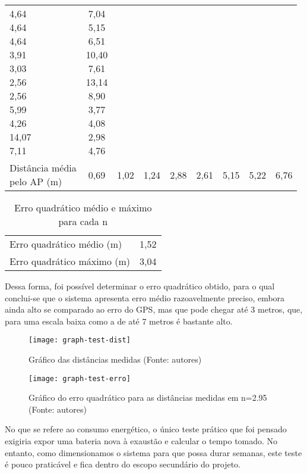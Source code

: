 \begin{table}[ht]
\begin{tabular}{l|cccccccc}
\makecell{4,64 \\ 4,64 \\ 4,64 \\ 3,91 \\ 3,03 \\ 2,56 \\ 2,56 \\ 5,99 \\ 4,26 \\ 14,07 \\ 7,11} &
\makecell{7,04 \\ 5,15 \\ 6,51 \\ 10,40 \\ 7,61 \\ 13,14 \\ 8,90 \\ 3,77 \\ 4,08 \\ 2,98 \\ 4,76}
\vspace{0.4cm}\\

\makecell{Distância média \\ pelo AP (m)} & 0,69 & 1,02 & 1,24 & 2,88 & 2,61 & 5,15 & 5,22 & 6,76
\end{tabular}
\end{table}

\begin{table}[ht]
\centering
\caption{Erro quadrático médio e máximo para cada n}
\vspace{0.5cm}
\begin{tabular}{l|c}
\hline
Erro quadrático médio (m) & 1,52 \vspace{0.4cm}\\
Erro quadrático máximo (m) & 3,04
\end{tabular}
\end{table}

Dessa forma, foi possível determinar o erro quadrático obtido, para o qual conclui-se que o sistema apresenta erro médio razoavelmente preciso, embora ainda alto se comparado ao erro do GPS, mas que pode chegar até 3 metros, que, para uma escala baixa como a de até 7 metros é bastante alto.

\begin{figure}[ht]
  \centering
    \texttt{[image: graph-test-dist]}
  \caption{Gráfico das distâncias medidas (Fonte: autores)}
\end{figure}

\begin{figure}[ht]
  \centering
    \texttt{[image: graph-test-erro]}
  \caption{Gráfico do erro quadrático para as distâncias medidas em n=2.95 (Fonte: autores)}
\end{figure}

No que se refere ao consumo energético, o único teste prático que foi pensado exigiria expor uma bateria nova à exaustão e calcular o tempo tomado. No entanto, como dimensionamos o sistema para que possa durar semanas, este teste é pouco praticável e fica dentro do escopo secundário do projeto.
